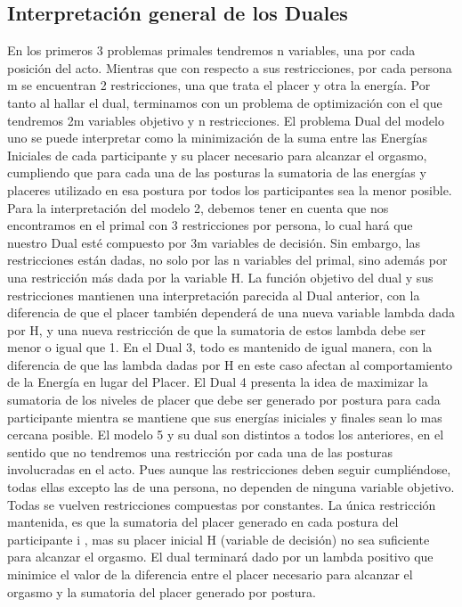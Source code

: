 \documentclass{llncs}
\begin{document}
\subsection{Interpretación general de los Duales}
En los primeros 3 problemas primales tendremos n variables, una por cada posición del acto. Mientras que con respecto a sus restricciones, por cada persona m se encuentran 2 restricciones, una que trata el placer y otra la energía. Por tanto al hallar el dual, terminamos con un problema de optimización con el que tendremos 2m variables objetivo y n restricciones.
\newline
\newline
El problema Dual del modelo uno se puede interpretar como la minimización de la suma entre las Energías Iniciales de cada participante y su placer necesario para alcanzar el orgasmo, cumpliendo que para cada una de las posturas la sumatoria de las energías y placeres utilizado en esa postura por todos los participantes sea la menor posible.
\newline
\newline
Para la interpretación del modelo 2, debemos tener en cuenta que nos encontramos en el primal con 3 restricciones por persona, lo cual hará que nuestro Dual esté compuesto por 3m variables de decisión. Sin embargo, las restricciones están dadas, no solo por las n variables del primal, sino además por una restricción más dada por la variable H. La función objetivo del dual y sus restricciones mantienen una interpretación parecida al Dual anterior, con la diferencia de que el placer también dependerá de una nueva variable lambda dada por H, y una nueva restricción de que la sumatoria de estos lambda debe ser menor o igual que 1. En el Dual 3, todo es mantenido de igual manera, con la diferencia de que las lambda dadas por H en este caso afectan al comportamiento de la Energía en lugar del Placer.
\newline
\newline
El Dual 4 presenta la idea de maximizar la sumatoria de los niveles de placer que debe ser generado por postura para cada participante mientra se mantiene que sus energías iniciales y finales sean lo mas cercana posible.
\newline
\newline
El modelo 5 y su dual son distintos a todos los anteriores, en el sentido que no tendremos una restricción por cada una de las posturas involucradas en el acto. Pues aunque las restricciones deben seguir cumpliéndose, todas ellas excepto las de una persona, no dependen de ninguna variable objetivo. Todas se vuelven restricciones compuestas por constantes. La única restricción mantenida, es que la sumatoria del placer generado en cada postura del participante i , mas su placer inicial H (variable de decisión) no sea suficiente para alcanzar el orgasmo. El dual terminará dado por un lambda positivo que minimice el valor de la diferencia entre el placer necesario para alcanzar el orgasmo y la sumatoria del placer generado por postura. 
\end{document}
